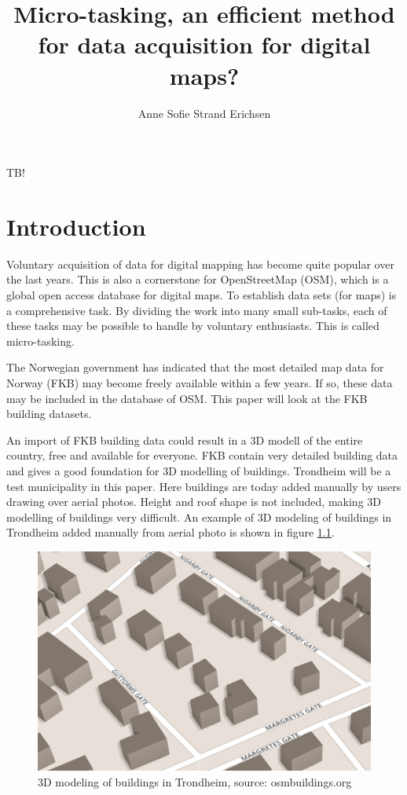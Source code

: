 \documentclass[12pt, a4paper]{report}   	%
\title{Micro-tasking, an efficient method for data acquisition for digital maps?}
\author{Anne Sofie Strand Erichsen}
\begin{document}


\setcounter{page}{1}


\abstract
TB!

\chapter{Introduction}\label{sec:intro}

Voluntary acquisition of data for digital mapping has become quite popular over the last years. This is also a cornerstone for OpenStreetMap (OSM), which is a global open access database for digital maps. To establish data sets (for maps) is a comprehensive task. By dividing the work into many small sub-tasks, each of these tasks may be possible to handle by voluntary enthusiasts. This is called micro-tasking.

The Norwegian government has indicated that the most detailed map data for Norway (FKB) may become freely available within a few years. If so, these data may be included in the database of OSM. This paper will look at the FKB building datasets.    

An import of FKB building data could result in a 3D modell of the entire country, free and available for everyone. FKB contain very detailed building data and gives a good foundation for 3D modelling of buildings. Trondheim will be a test municipality in this paper. Here buildings are today added manually by users drawing over aerial photos. Height and roof shape is not included, making 3D modelling of buildings very difficult. An example of 3D modeling of buildings in Trondheim added manually from aerial photo is shown in figure \ref{fig:3Dekstrd}.

\begin{figure}[H]
    \centering
    \includegraphics[scale=0.5]{figures/FixedByMe/3DmodellTRD.png}
    \caption{3D modeling of buildings in Trondheim, source: osmbuildings.org}
    \label{fig:3Dekstrd}
\end{figure}  
\end{document}
